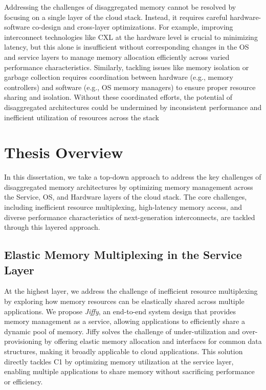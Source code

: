 
Addressing the challenges of disaggregated memory cannot be resolved by focusing on a single layer of the cloud stack. Instead, it requires careful hardware-software co-design and cross-layer optimizations. For example, improving interconnect technologies like CXL at the hardware level is crucial to minimizing latency, but this alone is insufficient without corresponding changes in the OS and service layers to manage memory allocation efficiently across varied performance characteristics. Similarly, tackling issues like memory isolation or garbage collection requires coordination between hardware (e.g., memory controllers) and software (e.g., OS memory managers) to ensure proper resource sharing and isolation. Without these coordinated efforts, the potential of disaggregated architectures could be undermined by inconsistent performance and inefficient utilization of resources across the stack


\section{Thesis Overview}

In this dissertation, we take a top-down approach to address the key challenges of disaggregated memory architectures by optimizing memory management across the Service, OS, and Hardware layers of the cloud stack. The core challenges, including inefficient resource multiplexing, high-latency memory access, and diverse performance characteristics of next-generation interconnects, are tackled through this layered approach.


\subsection{Elastic Memory Multiplexing in the Service Layer}

At the highest layer, we address the challenge of inefficient resource multiplexing by exploring how memory resources can be elastically shared across multiple applications. We propose \textit{Jiffy}, an end-to-end system design that provides memory management as a service, allowing applications to efficiently share a dynamic pool of memory. Jiffy solves the challenge of under-utilization and over-provisioning by offering elastic memory allocation and interfaces for common data structures, making it broadly applicable to cloud applications. This solution directly tackles C1 by optimizing memory utilization at the service layer, enabling multiple applications to share memory without sacrificing performance or efficiency.


